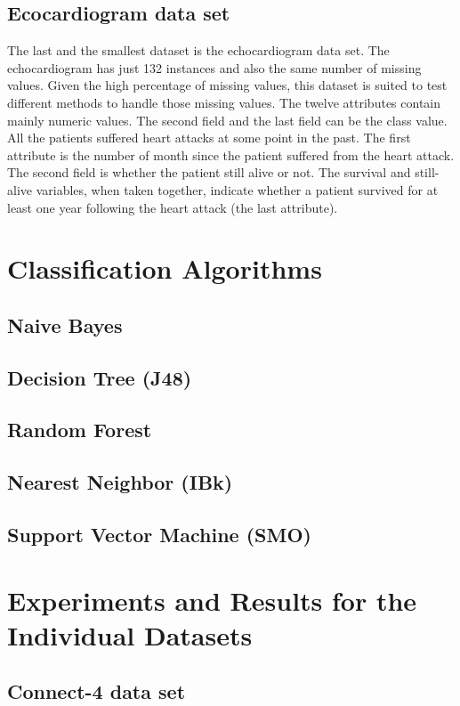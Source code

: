 \documentclass[a4paper]{article}
\begin{document}
\subsection{Ecocardiogram data set}
The last and the smallest dataset is the echocardiogram data set. The
echocardiogram has just 132 instances and also the same number of missing
values. Given the high percentage of
missing values, this dataset is suited to test different methods to handle those
missing values. The twelve attributes contain mainly numeric values. The second
field and the last field can be the class value. All the patients suffered heart
attacks at some point in the past. The first attribute is the number of month
since the patient suffered from the heart attack. 
The second field is whether the patient still
alive or not. The survival and still-alive variables, when taken together,
indicate whether a patient survived for at least one year following the heart
attack (the last attribute). 

\section{Classification Algorithms}

    \subsection{ Naive Bayes}
    \subsection{ Decision Tree (J48)}
    \subsection{ Random Forest}
    \subsection{ Nearest Neighbor (IBk)}
    \subsection{ Support Vector Machine (SMO)}

\section{Experiments and Results for the Individual Datasets}

\subsection{Connect-4 data set}
\end{document}
